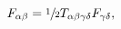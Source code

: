 \begin{equation}\label{eq:sdoe}
 F_{\alpha\beta}=\sfrac{1}{2}T_{\alpha\beta\gamma\delta}F_{\gamma\delta},
\end{equation}

